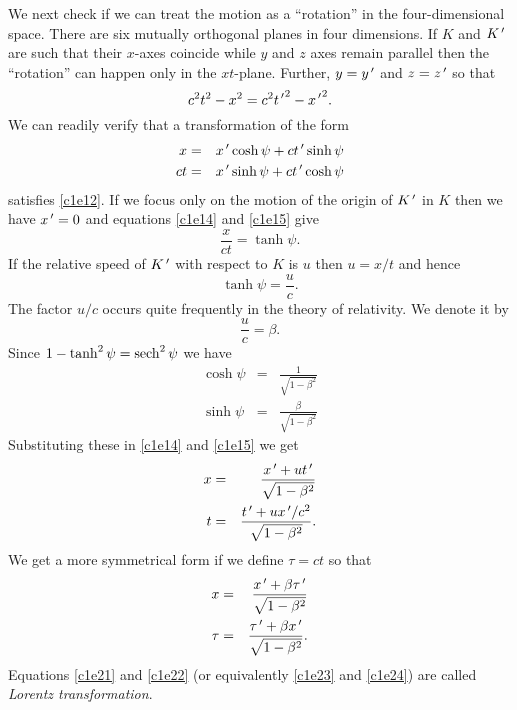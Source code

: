 \begin{enumerate}
We next check if we can treat the motion as a ``rotation'' in the four-dimensional
space. There are six mutually orthogonal planes in four dimensions. If $K$ and
$K^{\,\prime}$ are such that their $x$-axes coincide while $y$ and $z$ axes remain parallel
then the ``rotation'' can happen only in the $xt$-plane. Further, $y = y^{\,\prime}$ and
$z = z^{\,\prime}$ so that
\begin{equation}\label{c1e13}
c^2t^2 - x^2 = c^2{t^{\,\prime}}^2 - {x^{\,\prime}}^2.
\end{equation}
We can readily verify that a transformation of the form
\begin{eqnarray}
 x  &=&  x^{\,\prime}\cosh\psi + c t^{\,\prime}\sinh\psi \label{c1e14} \\
c t &=&  x^{\,\prime}\sinh\psi + c t^{\,\prime}\cosh\psi \label{c1e15}
\end{eqnarray}
satisfies \eqref{c1e12}. If we focus only on the motion of the origin of $K^{\,\prime}$
in $K$ then we have $x^{\,\prime} = 0$ and equations \eqref{c1e14} and \eqref{c1e15}
give
\begin{equation}\label{c1e16}
\frac{x}{ct} = \tanh\psi.
\end{equation}
If the relative speed of $K^{\,\prime}$ with respect to $K$ is $u$ then $u = x/t$ and
hence
\begin{equation}\label{c1e17}
\tanh\psi = \frac{u}{c}.
\end{equation}
The factor $u/c$ occurs quite frequently in the theory of relativity. We denote 
it by
\begin{equation}\label{c1e18}
\frac{u}{c} = \beta.
\end{equation}
Since $1 - \tanh^2\psi = \operatorname{sech}^2\psi$ we have
\begin{eqnarray}
\cosh\psi &=& \frac{1}{\sqrt{1 - \beta^2}} \label{c1e19} \\
\sinh\psi &=& \frac{\beta}{\sqrt{1 - \beta^2}} \label{c1e20}
\end{eqnarray}
Substituting these in \eqref{c1e14} and \eqref{c1e15} we get 
\begin{eqnarray}
x &=& \frac{x^{\,\prime} + ut^{\,\prime}}{\sqrt{1 - \beta^2}} \label{c1e21} \\
t &=& \frac{t^{\,\prime} + ux^{\,\prime}/c^2}{\sqrt{1 - \beta^2}}. \label{c1e22} 
\end{eqnarray}
We get a more symmetrical form if we define $\tau = ct$ so that
\begin{eqnarray}
x &=& \frac{x^{\,\prime} + \beta\tau^{\,\prime}}{\sqrt{1 - \beta^2}} \label{c1e23} \\
\tau &=& \frac{\tau^{\,\prime} + \beta x^{\,\prime}}{\sqrt{1 - \beta^2}}. \label{c1e24} 
\end{eqnarray}
Equations \eqref{c1e21} and \eqref{c1e22} (or equivalently \eqref{c1e23}
and \eqref{c1e24}) are called \emph{Lorentz transformation}.


\end{enumerate}
